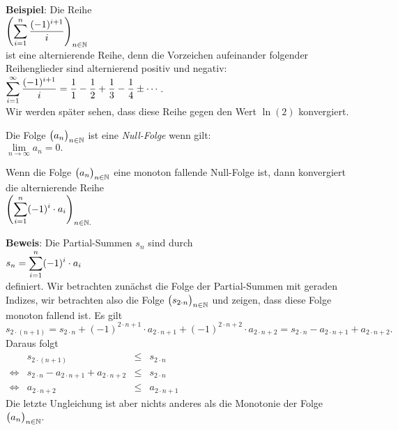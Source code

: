 \noindent
\textbf{Beispiel}: Die Reihe
\\[0.2cm]
\hspace*{1.3cm}
$\displaystyle\left(\sum\limits_{i=1}^{n} \frac{(-1)^{i+1}}{i}\right)_{n\in\mathbb{N}}$
\\[0.2cm]
ist eine alternierende Reihe, denn die Vorzeichen aufeinander folgender Reihenglieder sind alternierend positiv und negativ:
\\[0.2cm]
\hspace*{1.3cm}
$\displaystyle\sum\limits_{i=1}^{\infty} \frac{(-1)^{i+1}}{i} = \frac{1}{1} - \frac{1}{2} + \frac{1}{3} - \frac{1}{4} \pm \cdots$.
\\[0.2cm]
Wir werden sp\"ater sehen, dass diese Reihe gegen den Wert $\ln(2)$ konvergiert.
\eox


\begin{Definition}
Die Folge $\bigl(a_n\bigr)_{n\in\mathbb{N}}$ ist eine \emph{Null-Folge} wenn gilt:
\\[0.2cm]
\hspace*{1.3cm}
$ \lim\limits_{n\rightarrow\infty} a_n = 0. $ \eod
\end{Definition}


\begin{Satz} \lb
Wenn die Folge $\bigl(a_n\bigr)_{n\in\mathbb{N}}$ eine monoton fallende Null-Folge ist, dann 
konvergiert die alternierende Reihe
\\[0.2cm]
\hspace*{1.3cm}
$\displaystyle \left(\sum\limits_{i=1}^{n} (-1)^i \cdot  a_i\right)_{n\in\mathbb{N}.} $
\end{Satz}
  
\noindent
\textbf{Beweis}:  Die  Partial-Summen $s_n$ sind durch
\\[0.2cm]
\hspace*{1.3cm}
$\displaystyle s_n = \sum\limits_{i=1}^{n} (-1)^i \cdot  a_i $
\\[0.2cm]
definiert.  Wir betrachten zun\"achst die Folge der Partial-Summen mit geraden Indizes, wir
betrachten also die Folge $\bigl(s_{2 \cdot n}\bigr)_{n\in\mathbb{N}}$ und zeigen, dass diese Folge monoton fallend
ist.  Es gilt
\begin{equation}
  \label{eq:seq1}
 s_{2\cdot(n+1)} = s_{2\cdot n} + (-1)^{2\cdot n+1}\cdot a_{2 \cdot n+1} + (-1)^{2 \cdot n+2} \cdot  a_{2\cdot n+2} 
                 = s_{2 \cdot n} - a_{2 \cdot n+1} + a_{2 \cdot n+2}. 
\end{equation}
Daraus folgt
\\[0.2cm]
\hspace*{1.3cm}
$
\begin{array}{lrcl}
                 &   s_{2\cdot(n+1)} & \leq & s_{2\cdot n}       \\[0.2cm]
 \Leftrightarrow & s_{2\cdot n} - a_{2\cdot n+1} + a_{2\cdot n+2} & \leq &s_{2\cdot n}   \\[0.2cm]
 \Leftrightarrow &  a_{2\cdot n+2} & \leq & a_{2\cdot n+1}        
\end{array}
$
\\[0.2cm]
Die letzte Ungleichung ist aber nichts anderes als die Monotonie der Folge $\bigl(a_n\bigr)_{n\in\mathbb{N}}$.

